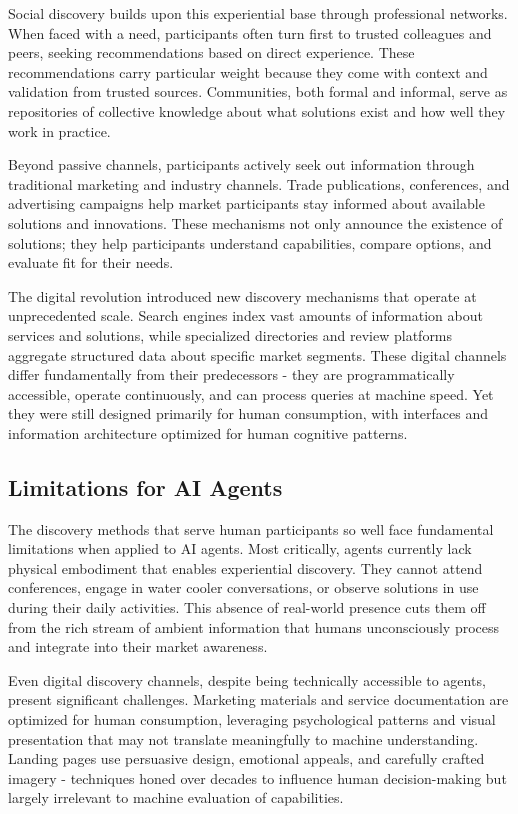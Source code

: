 \documentclass{article}
\begin{document}
Social discovery builds upon this experiential base through professional networks. When faced with a need, participants often turn first to trusted colleagues and peers, seeking recommendations based on direct experience. These recommendations carry particular weight because they come with context and validation from trusted sources. Communities, both formal and informal, serve as repositories of collective knowledge about what solutions exist and how well they work in practice.

Beyond passive channels, participants actively seek out information through traditional marketing and industry channels. Trade publications, conferences, and advertising campaigns help market participants stay informed about available solutions and innovations. These mechanisms not only announce the existence of solutions; they help participants understand capabilities, compare options, and evaluate fit for their needs.

The digital revolution introduced new discovery mechanisms that operate at unprecedented scale. Search engines index vast amounts of information about services and solutions, while specialized directories and review platforms aggregate structured data about specific market segments. These digital channels differ fundamentally from their predecessors - they are programmatically accessible, operate continuously, and can process queries at machine speed. Yet they were still designed primarily for human consumption, with interfaces and information architecture optimized for human cognitive patterns.

\subsection{Limitations for AI Agents}
\label{subsec:discovery_limitations}
The discovery methods that serve human participants so well face fundamental limitations when applied to AI agents. Most critically, agents currently lack physical embodiment that enables experiential discovery. They cannot attend conferences, engage in water cooler conversations, or observe solutions in use during their daily activities. This absence of real-world presence cuts them off from the rich stream of ambient information that humans unconsciously process and integrate into their market awareness.

Even digital discovery channels, despite being technically accessible to agents, present significant challenges. Marketing materials and service documentation are optimized for human consumption, leveraging psychological patterns and visual presentation that may not translate meaningfully to machine understanding. Landing pages use persuasive design, emotional appeals, and carefully crafted imagery - techniques honed over decades to influence human decision-making but largely irrelevant to machine evaluation of capabilities.
\end{document}
